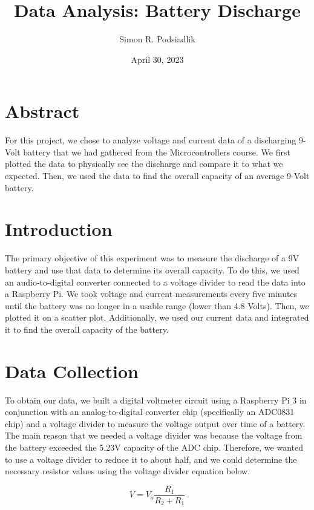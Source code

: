 \documentclass{article}
\author{Simon R. Podsiadlik}
\title{Data Analysis: Battery Discharge}
\date{April 30, 2023}
\begin{document}
\maketitle

\section{Abstract}
For this project, we chose to analyze voltage and current data of a discharging 9-Volt battery that we had gathered from the Microcontrollers course. We first plotted the data to physically see the discharge and compare it to what we expected. Then, we used the data to find the overall capacity of an average 9-Volt battery.

\section{Introduction}
The primary objective of this experiment was to measure the discharge of a 9V battery and use that data to determine its overall capacity. To do this, we used an audio-to-digital converter connected to a voltage divider to read the data into a Raspberry Pi. We took voltage and current measurements every five minutes until the battery was no longer in a usable range (lower than 4.8 Volts). Then, we plotted it on a scatter plot. Additionally, we used our current data and integrated it to find the overall capacity of the battery.

\section{Data Collection}
To obtain our data, we built a digital voltmeter circuit using a Raspberry Pi 3 in conjunction with an analog-to-digital converter chip (specifically an ADC0831 chip) and a voltage divider to measure the voltage output over time of a battery. 
The main reason that we needed a voltage divider was because the voltage from the battery exceeded the 5.23V capacity of the ADC chip. \cite{ADC0831} Therefore, we wanted to use a voltage divider to reduce it to about half, and we could determine the necessary resistor values using the voltage divider equation below.

\begin{equation}
    V = V_o \frac{R_1}{R_2 + R_1}
    \label{eq:volt_divide}
\end{equation}
\end{document}
